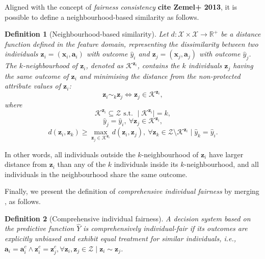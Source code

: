 \documentclass[letterpaper]{article} %
\newtheorem{definition}{Definition}
\begin{document}
Aligned with the concept of \emph{fairness consistency} \textbf{cite Zemel+ 2013}, it is possible to define a neighbourhood-based similarity as follows.
%
\begin{definition}[Neighbourhood-based similarity]\label{similar_individuals_neigh}
	Let $d: \mathcal{X} \times \mathcal{X} \rightarrow \mathbb{R}^{+}$ be a distance function defined in the feature domain, representing the dissimilarity between two individuals $\boldsymbol{z}_i = (\boldsymbol{x}_i, \boldsymbol{a}_i)$ with outcome $\hat{y}_i$ and $\boldsymbol{z}_j = (\boldsymbol{x}_j, \boldsymbol{a}_j)$ with outcome $\hat{y}_j$.
	The $k$-neighbourhood of $\boldsymbol{z}_i$, denoted as $\mathcal{K}^{\boldsymbol{z}_i}$, contains the $k$ individuals $\boldsymbol{z}_j$ having the same outcome of $\boldsymbol{z}_i$ and minimising the distance from the non-protected attribute values of $\boldsymbol{z}_i$:
	$$ \boldsymbol{z}_i \sim_k \boldsymbol{z}_j \iff \boldsymbol{z}_j \in \mathcal{K}^{\boldsymbol{z}_i}, $$
	where
	$$\mathcal{K}^{\boldsymbol{z}_i} \subseteq \mathcal{Z} \text{~s.t.~} \mid \mathcal{K}^{\boldsymbol{z}_i} \mid = k,$$
	$$\hat{y}_j = \hat{y}_i, ~ \forall \boldsymbol{z}_j \in \mathcal{K}^{\boldsymbol{z}_i},$$
	$$d(\boldsymbol{z}_i, \boldsymbol{z}_k) \geq \underset{\boldsymbol{z}_j \in \mathcal{K}^{\boldsymbol{z}_i}}{\max} d(\boldsymbol{z}_i, \boldsymbol{z}_j), ~ \forall \boldsymbol{z}_k \in \mathcal{Z} \setminus \mathcal{K}^{\boldsymbol{z}_i} \mid \hat{y}_k = \hat{y}_i.$$
\end{definition}
%
\noindent In other words, all individuals outside the $k$-neighbourhood of $\boldsymbol{z}_i$ have larger distance from $\boldsymbol{z}_i$ than any of the $k$ individuals inside its $k$-neighbourhood, and all individuals in the neighbourhood share the same outcome.

Finally, we present the definition of \emph{comprehensive individual fairness} by merging , as follows.
%
\begin{definition}[Comprehensive individual fairness]\label{comprehensive}
	A decision system based on the predictive function $\hat{Y}$ is \emph{comprehensively individual-fair} if its outcomes are explicitly unbiased and exhibit equal treatment for similar individuals, i.e., $\boldsymbol{a}_i = \boldsymbol{a}_i^c \wedge \boldsymbol{z}_i^c = \boldsymbol{z}_j^c, \forall \boldsymbol{z}_i, \boldsymbol{z}_j \in \mathcal{Z} \mid \boldsymbol{z}_i \sim \boldsymbol{z}_j$.
\end{definition}
\end{document}
